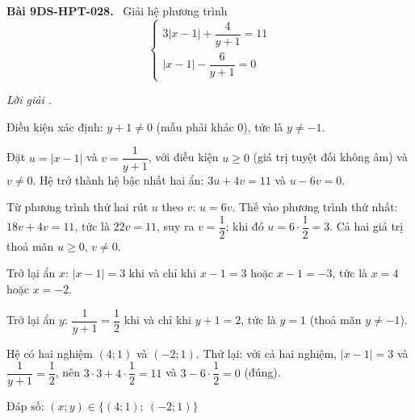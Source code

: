 \documentclass[12pt,a4paper]{article}
\newenvironment{problem}[1][]{\par\medskip\noindent\textbf{Bài #1.}\ }{\par}
\newenvironment{solution}[1][]{\par\noindent\textit{Lời giải #1.}\par}{\par}
\begin{document}
\begin{problem}[9DS-HPT-028]
Giải hệ phương trình
\[ \begin{cases} 3|x - 1| + \dfrac{4}{y + 1} = 11 \\ |x - 1| - \dfrac{6}{y + 1} = 0 \end{cases} \]

\begin{solution}
Điều kiện xác định: $y + 1 \neq 0$ (mẫu phải khác $0$), tức là $y \neq -1$.

Đặt $u = |x - 1|$ và $v = \dfrac{1}{y + 1}$, với điều kiện $u \geq 0$ (giá trị tuyệt đối không âm) và $v \neq 0$. Hệ trở thành hệ bậc nhất hai ẩn: $3u + 4v = 11$ và $u - 6v = 0$.

Từ phương trình thứ hai rút $u$ theo $v$: $u = 6v$. Thế vào phương trình thứ nhất: $18v + 4v = 11$, tức là $22v = 11$, suy ra $v = \dfrac{1}{2}$; khi đó $u = 6 \cdot \dfrac{1}{2} = 3$. Cả hai giá trị thoả mãn $u \geq 0$, $v \neq 0$.

Trở lại ẩn $x$: $|x - 1| = 3$ khi và chỉ khi $x - 1 = 3$ hoặc $x - 1 = -3$, tức là $x = 4$ hoặc $x = -2$.

Trở lại ẩn $y$: $\dfrac{1}{y + 1} = \dfrac{1}{2}$ khi và chỉ khi $y + 1 = 2$, tức là $y = 1$ (thoả mãn $y \neq -1$).

Hệ có hai nghiệm $(4; 1)$ và $(-2; 1)$. Thử lại: với cả hai nghiệm, $|x - 1| = 3$ và $\dfrac{1}{y + 1} = \dfrac{1}{2}$, nên $3 \cdot 3 + 4 \cdot \dfrac{1}{2} = 11$ và $3 - 6 \cdot \dfrac{1}{2} = 0$ (đúng).

Đáp số: $\boxed{(x; y) \in \{(4; 1);\ (-2; 1)\}}$
\end{solution}
\end{problem}
\end{document}
